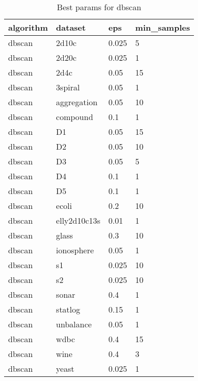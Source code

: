 \begin{table}[H]
\centering
\caption{Best params for dbscan}
\label{S12_Table}
\begin{tabular}{|l|l|l|l|}
\hline
algorithm & dataset & eps & min\_samples \\
\hline
dbscan & 2d10c & 0.025 & 5 \\
\hline
dbscan & 2d20c & 0.025 & 1 \\
\hline
dbscan & 2d4c & 0.05 & 15 \\
\hline
dbscan & 3spiral & 0.05 & 1 \\
\hline
dbscan & aggregation & 0.05 & 10 \\
\hline
dbscan & compound & 0.1 & 1 \\
\hline
dbscan & D1 & 0.05 & 15 \\
\hline
dbscan & D2 & 0.05 & 10 \\
\hline
dbscan & D3 & 0.05 & 5 \\
\hline
dbscan & D4 & 0.1 & 1 \\
\hline
dbscan & D5 & 0.1 & 1 \\
\hline
dbscan & ecoli & 0.2 & 10 \\
\hline
dbscan & elly2d10c13s & 0.01 & 1 \\
\hline
dbscan & glass & 0.3 & 10 \\
\hline
dbscan & ionosphere & 0.05 & 1 \\
\hline
dbscan & s1 & 0.025 & 10 \\
\hline
dbscan & s2 & 0.025 & 10 \\
\hline
dbscan & sonar & 0.4 & 1 \\
\hline
dbscan & statlog & 0.15 & 1 \\
\hline
dbscan & unbalance & 0.05 & 1 \\
\hline
dbscan & wdbc & 0.4 & 15 \\
\hline
dbscan & wine & 0.4 & 3 \\
\hline
dbscan & yeast & 0.025 & 1 \\
\hline
\end{tabular}
\end{table}

\clearpage

